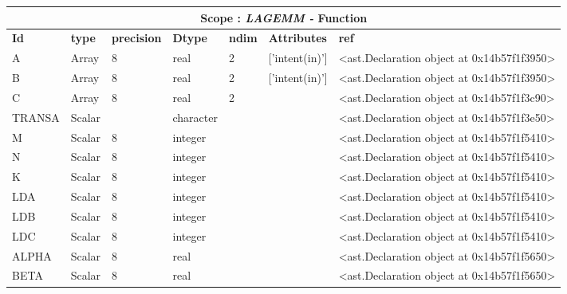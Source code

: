 \documentclass{report}
\begin{document}
\begin{center}
\begin{longtable}{|p{3.5cm}|p{1.5cm}|p{1.5cm}|p{1.5cm}|p{1cm}|p{2cm}|p{4cm}| }
\hline
\multicolumn{7}{|c|}{\textbf{Scope : \qquad}  \textbf{\textit{LAGEMM - }Function}}\\ 
\hline
\textbf{Id} & \textbf{type} & \textbf{precision} & \textbf{Dtype} & \textbf{ndim} & \textbf{Attributes} & \textbf{ref} \\\hline

A & Array & 8 & real & 2 & ['intent(in)'] & <ast.Declaration object at 0x14b57f1f3950> \\\hline

B & Array & 8 & real & 2 & ['intent(in)'] & <ast.Declaration object at 0x14b57f1f3950> \\\hline

C & Array & 8 & real & 2 &  & <ast.Declaration object at 0x14b57f1f3c90> \\\hline

TRANSA & Scalar &  & character &  &  & <ast.Declaration object at 0x14b57f1f3e50> \\\hline

M & Scalar & 8 & integer &  &  & <ast.Declaration object at 0x14b57f1f5410> \\\hline

N & Scalar & 8 & integer &  &  & <ast.Declaration object at 0x14b57f1f5410> \\\hline

K & Scalar & 8 & integer &  &  & <ast.Declaration object at 0x14b57f1f5410> \\\hline

LDA & Scalar & 8 & integer &  &  & <ast.Declaration object at 0x14b57f1f5410> \\\hline

LDB & Scalar & 8 & integer &  &  & <ast.Declaration object at 0x14b57f1f5410> \\\hline

LDC & Scalar & 8 & integer &  &  & <ast.Declaration object at 0x14b57f1f5410> \\\hline

ALPHA & Scalar & 8 & real &  &  & <ast.Declaration object at 0x14b57f1f5650> \\\hline

BETA & Scalar & 8 & real &  &  & <ast.Declaration object at 0x14b57f1f5650> \\\hline

\end{longtable}
\end{center}
\end{document}
